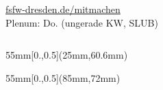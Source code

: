 \documentclass[t]{beamer}
\begin{document}
\begin{frame}[label=ct5]{\color{fg}{}}
 \vspace{6mm}


\begin{columns}

\begin{flushright}
\huge
\url{fsfw-dresden.de/mitmachen}\\
{\tiny Plenum: Do. (ungerade KW, SLUB)}\\[3mm]
\end{flushright}
~
\end{columns}

 
  \begin{textblock*}{55mm}[0.,0.5](25mm,60.6mm)
 \end{textblock*}
 
 
   \begin{textblock*}{55mm}[0.,0.5](85mm,72mm)
 \end{textblock*}




\end{frame}


\end{document}
